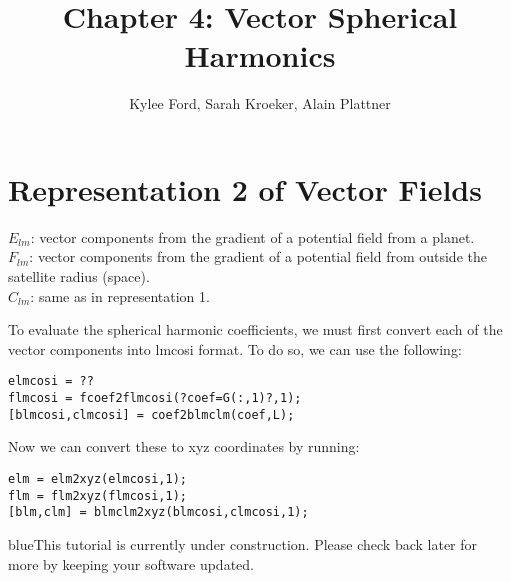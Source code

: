 \documentclass[11pt]{article}
\title{Chapter 4: Vector Spherical Harmonics}
\author{Kylee Ford, Sarah Kroeker, Alain Plattner}
\newcommand{\TAG}{\begin{color}{blue}This tutorial is currently under construction. Please check back later for more by keeping your software updated.\end{color}}
\begin{document}
\maketitle

\section{Representation 2 of Vector Fields}



$E_{lm}$: vector components from the gradient of a potential field from a planet. \\
$F_{lm}$: vector components from the gradient of a potential field from outside the satellite radius (space). \\
$C_{lm}$: same as in representation 1.

To evaluate the spherical harmonic coefficients, we must first convert each of the vector components into lmcosi format.  To do so, we can use the following:

\verb|elmcosi = ??|\\
\verb|flmcosi = fcoef2flmcosi(?coef=G(:,1)?,1);|\\
\verb|[blmcosi,clmcosi] = coef2blmclm(coef,L);|

Now we can convert these to xyz coordinates by running:

\verb|elm = elm2xyz(elmcosi,1);|\\
\verb|flm = flm2xyz(flmcosi,1);|\\
\verb|[blm,clm] = blmclm2xyz(blmcosi,clmcosi,1);|





\TAG
\end{document}
